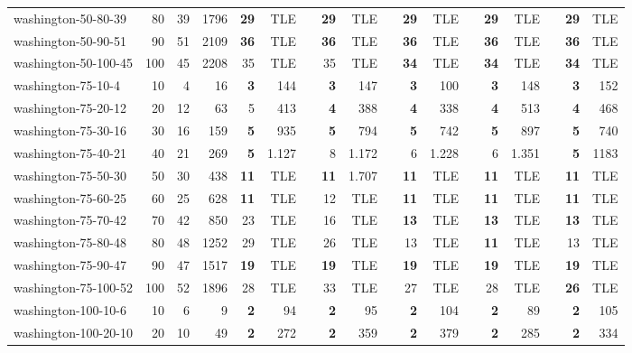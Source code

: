 \begin{table}[!ht]
{\begin{tabular}{lrrrrrrrrrrrrrrrrr}
washington-50-80-39 & 80 & 39 & 1796 & \textbf{29} & TLE &  & \textbf{29} & TLE &  & \textbf{29} & TLE &  & \textbf{29} & TLE &  & \textbf{29} & TLE \\
washington-50-90-51 & 90 & 51 & 2109 & \textbf{36} & TLE &  & \textbf{36} & TLE &  & \textbf{36} & TLE &  & \textbf{36} & TLE &  & \textbf{36} & TLE \\
washington-50-100-45 & 100 & 45 & 2208 & 35 & TLE &  & 35 & TLE &  & \textbf{34} & TLE &  & \textbf{34} & TLE &  & \textbf{34} & TLE \\ \hline
washington-75-10-4 & 10 & 4 & 16 & \textbf{3} & 144 &  & \textbf{3} & 147 &  & \textbf{3} & 100 &  & \textbf{3} & 148 &  & \textbf{3} & 152 \\
washington-75-20-12 & 20 & 12 & 63 & 5 & 413 &  & \textbf{4} & 388 &  & \textbf{4} & 338 &  & \textbf{4} & 513 &  & \textbf{4} & 468 \\
washington-75-30-16 & 30 & 16 & 159 & \textbf{5} & 935 &  & \textbf{5} & 794 &  & \textbf{5} & 742 &  & \textbf{5} & 897 &  & \textbf{5} & 740 \\
washington-75-40-21 & 40 & 21 & 269 & \textbf{5} & 1.127 &  & 8 & 1.172 &  & 6 & 1.228 &  & 6 & 1.351 &  & \textbf{5} & 1183 \\
washington-75-50-30 & 50 & 30 & 438 & \textbf{11} & TLE &  & \textbf{11} & 1.707 &  & \textbf{11} & TLE &  & \textbf{11} & TLE &  & \textbf{11} & TLE \\
washington-75-60-25 & 60 & 25 & 628 & \textbf{11} & TLE &  & 12 & TLE &  & \textbf{11} & TLE &  & \textbf{11} & TLE &  & \textbf{11} & TLE \\
washington-75-70-42 & 70 & 42 & 850 & 23 & TLE &  & 16 & TLE &  & \textbf{13} & TLE &  & \textbf{13} & TLE &  & \textbf{13} & TLE \\
washington-75-80-48 & 80 & 48 & 1252 & 29 & TLE &  & 26 & TLE &  & 13 & TLE &  & \textbf{11} & TLE &  & 13 & TLE \\
washington-75-90-47 & 90 & 47 & 1517 & \textbf{19} & TLE &  & \textbf{19} & TLE &  & \textbf{19} & TLE &  & \textbf{19} & TLE &  & \textbf{19} & TLE \\
washington-75-100-52 & 100 & 52 & 1896 & 28 & TLE &  & 33 & TLE &  & 27 & TLE &  & 28 & TLE &  & \textbf{26} & TLE \\ \hline
washington-100-10-6 & 10 & 6 & 9 & \textbf{2} & 94 &  & \textbf{2} & 95 &  & \textbf{2} & 104 &  & \textbf{2} & 89 &  & \textbf{2} & 105 \\
washington-100-20-10 & 20 & 10 & 49 & \textbf{2} & 272 &  & \textbf{2} & 359 &  & \textbf{2} & 379 &  & \textbf{2} & 285 &  & \textbf{2} & 334 \\

\end{tabular}}
\end{table}
